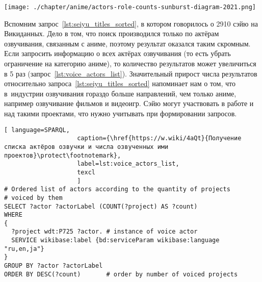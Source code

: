 \newpage
\noindent\begin{marginfigure}%
{%
%
    \texttt{[image: ./chapter/anime/actors-role-counts-sunburst-diagram-2021.png]}%
}%
    \caption[Круговая диаграмма числа ролей, озвученных различными сэйю, 2021 год.]{Диаграмма <<солнечные лучи>> числа ролей, озвученных различными актёрами, построенная в~2021 году с~помощью сервиса Rawgraphs (\href{https://app.rawgraphs.io}{https://app.rawgraphs.io})}%
\label{fig:roles_piechart}%
\end{marginfigure}%
%
Вспомним запрос~\ref{lst:seiyu_titles_sorted}, в котором говорилось о \num{2910} сэйю на Викиданных. Дело в том, что поиск производился только по актёрам озвучивания, связанным с аниме, поэтому результат оказался таким скромным. Если запросить информацию о всех актёрах озвучивания (то есть убрать ограничение на категорию аниме), то количество результатов может увеличиться в \num{5} раз (запрос~\ref{lst:voice_actors_list}). Значительный прирост числа результатов относительно запроса~\ref{lst:seiyu_titles_sorted} напоминает нам о том, что в~индустрии озвучивания гораздо больше направлений, 
чем только аниме, например озвучивание фильмов и видеоигр. 
Сэйю могут участвовать в работе и над такими проектами, что нужно учитывать при формировании запросов. 

\begin{lstlisting}[ language=SPARQL, 
                    caption={\href{https://w.wiki/4aQt}{Получение списка актёров озвучки и числа озвученных ими проектов}\protect\footnotemark},
                    label=lst:voice_actors_list,
                    texcl 
                    ]
# Ordered list of actors according to the quantity of projects
# voiced by them
SELECT ?actor ?actorLabel (COUNT(?project) AS ?count)
WHERE
{
  ?project wdt:P725 ?actor.	# instance of voice actor
  SERVICE wikibase:label {bd:serviceParam wikibase:language "ru,en,ja"}
}
GROUP BY ?actor ?actorLabel
ORDER BY DESC(?count)       # order by number of voiced projects
\end{lstlisting}%


